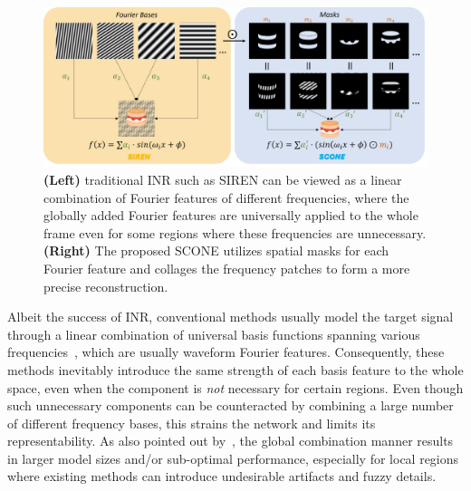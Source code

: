 \documentclass[letterpaper]{article} %
\begin{document}
\begin{figure}[ht]
    \centering
    \includegraphics[width=1\columnwidth]{Figures/Picture1.png}  
    \caption{\textbf{(Left)} traditional INR such as SIREN can be viewed as a linear combination of Fourier features of different frequencies, where the globally added Fourier features are universally applied to the whole frame even for some regions where these frequencies are unnecessary. \textbf{(Right)} The proposed SCONE utilizes spatial masks for each Fourier feature and collages the frequency patches to form a more precise reconstruction. }
    \label{fig:idea}
\end{figure}

Albeit the success of INR, conventional methods usually model the target signal through a linear combination of universal basis functions spanning various frequencies~\cite{2020siren, tancik2020fourier, fathony2020multiplicative}, which are usually waveform Fourier features. Consequently, these methods inevitably introduce the same strength of each basis feature to the whole space, even when the component is \textit{not} necessary for certain regions. Even though such unnecessary components can be counteracted by combining a large number of different frequency bases, this strains the network and limits its representability. As also pointed out by~\cite{dou2023multiplicative}, the global combination manner results in larger model sizes and/or sub-optimal performance, especially for local regions where existing methods can introduce undesirable artifacts and fuzzy details.
\end{document}
